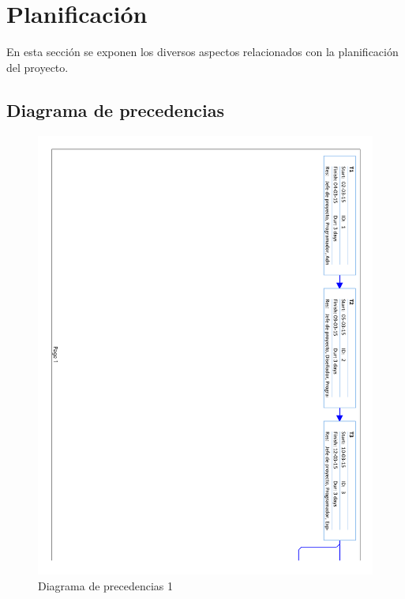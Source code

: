 \chapter{Planificación}

En esta sección se exponen los diversos aspectos relacionados con la planificación del proyecto.

\section{Diagrama de precedencias}

\begin{figure}[!htbp]
	\centering
	\includegraphics[page=1, scale=.65]{fig/real_network_diagram}
	\caption{Diagrama de precedencias 1}
\end{figure}

